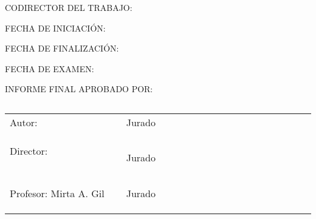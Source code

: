 \documentclass[a4paper,11pt,oneside]{book}
\begin{document}
    \bigskip

    {\large CODIRECTOR DEL TRABAJO:}

    \bigskip

    {\large FECHA DE INICIACIÓN:}

    \bigskip

    {\large FECHA DE FINALIZACIÓN:}

    \bigskip

    {\large FECHA DE EXAMEN: }

    \bigskip

    {\large INFORME FINAL APROBADO POR:}

    \begin{equation*}\end{equation*}
    \begin{equation*}\end{equation*}
    \begin{equation*}\end{equation*}
    \begin{equation*}\end{equation*}
    \begin{equation*}\end{equation*}
    \begin{equation*}\end{equation*}

    \begin{tabular}{lll}
        \cline{1-1}\cline{1-1}\cline{3-3}\cline{3-3}%
        Autor:  & & Jurado\ \ \ \ \ \ \ \ \ \ \ \ \ \ \
        \ \ \ \ \ \ \ \ \ \ \ \ \ \ \ \  \\
        && \\
        && \\
        && \\
        \cline{1-1}\cline{1-1}\cline{3-3}\cline{3-3}%
        Director: \ \ \ \ \ \ \ \ \ \ \ \ \  & & Jurado\\
        && \\
        && \\
        && \\
        \cline{1-1}\cline{1-1}\cline{3-3}\cline{3-3}%
        Profesor: Mirta A. Gil  &  & Jurado\\
        && \\
        && \\
        && \\
    \end{tabular}
\end{document}
